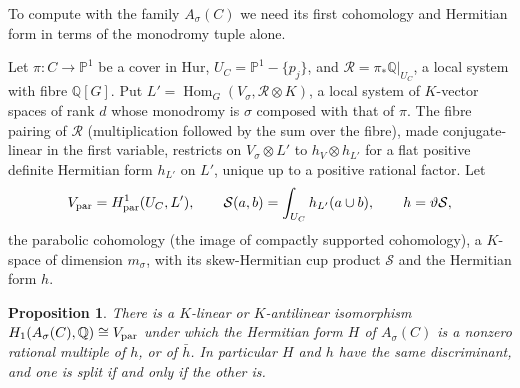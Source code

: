 \documentclass[11pt]{amsart}
\newtheorem{proposition}[theorem]{Proposition}
\theoremstyle{definition}
\theoremstyle{remark}
\newcommand{\Q}{\mathbb Q}
\newcommand{\PP}{\mathbb P}
\newcommand{\Hom}{\operatorname{Hom}}
\newcommand{\cH}{\mathrm{Hur}}
\newcommand{\Vp}{V_{\rm par}}
\begin{document}
To compute with the family $A_\sigma(C)$ we need its first cohomology and Hermitian form in terms of the monodromy tuple alone.

Let $\pi\colon C\to\PP^1$ be a cover in $\cH$, $U_C=\PP^1-\{p_j\}$, and $\mathcal R=\pi_*\Q|_{U_C}$, a local system with fibre $\Q[G]$. Put $L'=\Hom_G(V_\sigma,\mathcal R\otimes K)$, a local system of $K$-vector spaces of rank $d$ whose monodromy is $\sigma$ composed with that of $\pi$. The fibre pairing of $\mathcal R$ (multiplication followed by the sum over the fibre), made conjugate-linear in the first variable, restricts on $V_\sigma\otimes L'$ to $h_V\otimes h_{L'}$ for a flat positive definite Hermitian form $h_{L'}$ on $L'$, unique up to a positive rational factor. Let
\[
\Vp=H^1_{\rm par}(U_C,L'),\qquad \mathcal S(a,b)=\int_{U_C}h_{L'}(a\cup b),\qquad h=\vartheta\mathcal S,
\]
the parabolic cohomology (the image of compactly supported cohomology), a $K$-space of dimension $m_\sigma$, with its skew-Hermitian cup product $\mathcal S$ and the Hermitian form $h$.

\begin{proposition}\label{prop:herm}
There is a $K$-linear or $K$-antilinear isomorphism $H_1(A_\sigma(C),\Q)\cong\Vp$ under which the Hermitian form $H$ of $A_\sigma(C)$ is a nonzero rational multiple of $h$, or of $\bar h$. In particular $H$ and $h$ have the same discriminant, and one is split if and only if the other is.
\end{proposition}
\end{document}

